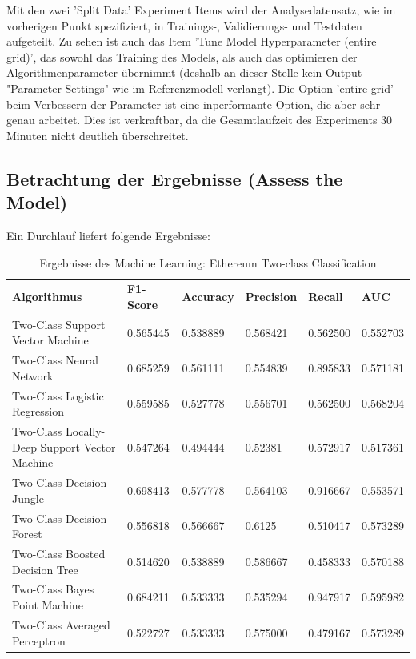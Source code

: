 Mit den zwei 'Split Data' Experiment Items wird der Analysedatensatz, wie im vorherigen Punkt spezifiziert, in Trainings-, Validierungs- und Testdaten aufgeteilt. Zu sehen ist auch das Item 'Tune Model Hyperparameter (entire grid)', das sowohl das Training des Models, als auch das optimieren der Algorithmenparameter übernimmt (deshalb an dieser Stelle kein Output "Parameter Settings" wie im Referenzmodell verlangt). Die Option 'entire grid' beim Verbessern der Parameter ist eine inperformante Option, die aber sehr genau arbeitet. Dies ist verkraftbar, da die Gesamtlaufzeit des Experiments 30 Minuten nicht deutlich überschreitet.

\subsection{Betrachtung der Ergebnisse (Assess the Model)}
Ein Durchlauf liefert folgende Ergebnisse:

\begin{table}[H]
\centering
\begin{tabular}{|p{5cm}|p{}|p{}|p{}|p{}|p{}|}
\hline
\textbf{Algorithmus} & \textbf{F1-Score} & \textbf{Accuracy} & \textbf{Precision} & \textbf{Recall} & \textbf{AUC}\\ 
\hhline{======}
Two-Class Support Vector Machine & 0.565445 & 0.538889 & 0.568421 & 0.562500 & 0.552703 \\ \hline
Two-Class Neural Network & 0.685259 & 0.561111 & 0.554839 & 0.895833 & 0.571181 \\ \hline
Two-Class Logistic Regression & 0.559585 & 0.527778 & 0.556701 & 0.562500 & 0.568204 \\ \hline
Two-Class Locally-Deep Support Vector Machine & 0.547264 & 0.494444 & 0.52381 & 0.572917 & 0.517361 \\ \hline
Two-Class Decision Jungle & 0.698413 & 0.577778 & 0.564103 & 0.916667 & 0.553571 \\ \hline
Two-Class Decision Forest & 0.556818 & 0.566667 & 0.6125 & 0.510417 & 0.573289 \\ \hline
Two-Class Boosted Decision Tree & 0.514620 & 0.538889 & 0.586667 & 0.458333 & 0.570188 \\ \hline
Two-Class Bayes Point Machine & 0.684211 & 0.533333 & 0.535294 & 0.947917 & 0.595982 \\ \hline
Two-Class Averaged Perceptron & 0.522727 & 0.533333 & 0.575000 & 0.479167 & 0.573289 \\ \hline
\end{tabular}
\caption{Ergebnisse des Machine Learning: Ethereum Two-class Classification}
\label{tab:ETH2}
\end{table}

